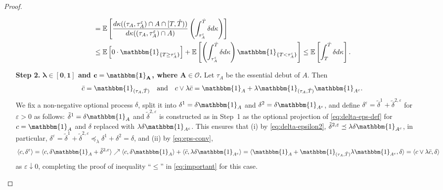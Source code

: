 \documentclass[11pt, oneside]{article}   	%
\theoremstyle{plain}
\theoremstyle{definition}
\theoremstyle{remark}
\begin{document}
\begin{proof}
\begin{enumerate}
\begin{equation*}
\begin{aligned}
&=\mathbb{E}\left[\frac{d\kappa((\tau_A,\tau_A^\varepsilon)\cap A\cap[T,{\hat{T}}))}{d\kappa((\tau_A,\tau_A^\varepsilon)\cap A)}\left(\int_{\tau_A^\varepsilon}^{\hat{T}}\delta d\kappa\right)\right]\\
&\leq \mathbb{E}\left[0\cdot \mathbbm{1}_{\{T\geq\tau_A^\varepsilon\}}\right]+\mathbb{E}\left[\left(\int_{\tau_A^\varepsilon}^{\hat{T}}\delta d\kappa\right)\mathbbm{1}_{\{T<\tau_A^\varepsilon\}}\right]\leq \mathbb{E}\left[\int_T^{\hat{T}}\delta d\kappa\right].\\
\end{aligned}
\end{equation*}
\item[\textbf{Step 2.}] \textbf{$\mathbf{\lambda\in[0,1]}$ and $\mathbf{c=\mathbbm{1}_A}$, where $\mathbf{A\in\mathcal{O}}$.} Let $\tau_A$ be the essential debut of $A$. Then $$\bar{c}=\mathbbm{1}_{(\tau_A,{\hat{T}})}\quad \text{and}\quad c\vee\lambda\bar{c}=\mathbbm{1}_{A}+\lambda\mathbbm{1}_{(\tau_A,{\hat{T}})}\mathbbm{1}_{A^c}.$$ We fix a non-negative optional process $\delta$, split it into $\delta^1=\delta\mathbbm{1}_{A}$ and $\delta^2=\delta\mathbbm{1}_{A^c}$, and define $\delta^\varepsilon=\tilde\delta^1+\tilde\delta^{2,\varepsilon}$ for $\varepsilon>0$ as follows: $\tilde\delta^1=\delta\mathbbm{1}_{A}$ and $\tilde\delta^{2,\varepsilon}$ is constructed as in Step~1 as the optional projection of \eqref{eq:delta-eps-def} for $c=\mathbbm{1}_{A}$ and $\delta$ replaced with $\lambda\delta\mathbbm{1}_{A^c}$. This ensures that (i) by \eqref{eq:delta-epsilon2}, $\tilde\delta^{2,\varepsilon}\preceq\lambda\delta\mathbbm{1}_{A^c}$, in particular, $\delta^\varepsilon=\tilde\delta^1+\tilde\delta^{2,\varepsilon}\preceq_\lambda \delta^1+\delta^2=\delta$, and (ii) by \eqref{eq:eps-conv},
\begin{equation*}
\langle c,\delta^\varepsilon \rangle=\langle c, \delta\mathbbm{1}_{A}+\tilde\delta^{2,\varepsilon} \rangle\nearrow\langle c,\delta\mathbbm{1}_{A}\rangle+\langle\bar{c},\lambda\delta\mathbbm{1}_{A^c} \rangle=\langle \mathbbm{1}_{A}+\mathbbm{1}_{(\tau_A,{\hat{T}})}\lambda\mathbbm{1}_{A^c},\delta \rangle=\langle c\vee\lambda\bar{c},\delta \rangle
\end{equation*}
as $\varepsilon\downarrow 0$, completing the proof of inequality ``$\leq$'' in \eqref{eq:important} for this case.


\end{enumerate}
\end{proof}
\end{document}
